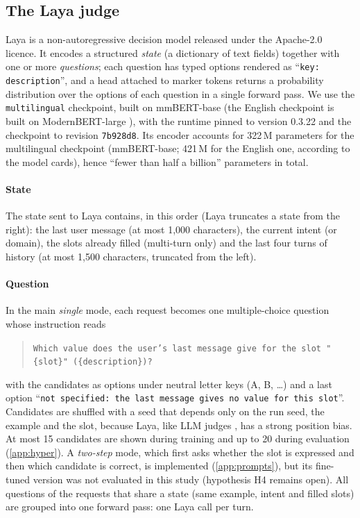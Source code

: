 \subsection{The Laya judge}
\label{sec:laya}

Laya \citep{laya2026} is a non-autoregressive decision model released under the Apache-2.0 licence. It encodes a structured \emph{state} (a dictionary of text fields) together with one or more \emph{questions}; each question has typed options rendered as ``\texttt{key: description}'', and a head attached to marker tokens returns a probability distribution over the options of each question in a single forward pass. We use the \texttt{multilingual} checkpoint, built on mmBERT-base \citep{marone2026mmbert} (the English checkpoint is built on ModernBERT-large \citep{warner2025modernbert}), with the runtime pinned to version 0.3.22 and the checkpoint to revision \texttt{7b928d8}. Its encoder accounts for 322\,M parameters for the multilingual checkpoint (mmBERT-base; 421\,M for the English one, according to the model cards), hence ``fewer than half a billion'' parameters in total.

\paragraph{State} The state sent to Laya contains, in this order (Laya truncates a state from the right): the last user message (at most 1,000 characters), the current intent (or domain), the slots already filled (multi-turn only) and the last four turns of history (at most 1,500 characters, truncated from the left).

\paragraph{Question} In the main \emph{single} mode, each request becomes one multiple-choice question whose instruction reads
\begin{quote}\small
\texttt{Which value does the user's last message give for the slot "\{slot\}" (\{description\})?}
\end{quote}
with the candidates as options under neutral letter keys (A, B, \ldots) and a last option ``\texttt{not specified: the last message gives no value for this slot}''. Candidates are shuffled with a seed that depends only on the run seed, the example and the slot, because Laya, like LLM judges \citep{wang2024fair}, has a strong position bias. At most 15 candidates are shown during training and up to 20 during evaluation (\cref{app:hyper}). A \emph{two-step} mode, which first asks whether the slot is expressed and then which candidate is correct, is implemented (\cref{app:prompts}), but its fine-tuned version was not evaluated in this study (hypothesis H4 remains open). All questions of the requests that share a state (same example, intent and filled slots) are grouped into one forward pass: one Laya call per turn.

